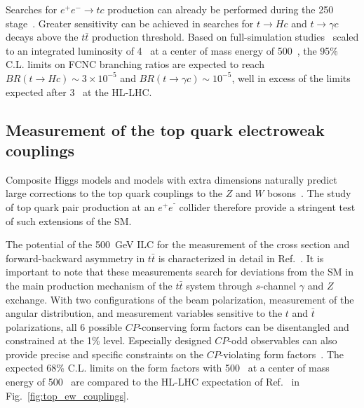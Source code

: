 Searches for $e^+e^- \rightarrow t c$ production can
already be performed during the 250~\GeV{} stage~\cite{Hesari:2014eua}. Greater
sensitivity can be achieved in searches for $t \rightarrow Hc$ and 
$t\rightarrow \gamma c$ decays above the $t\bar{t}$ production threshold.
Based on full-simulation studies~\cite{Zarnecki:2018wsw, Abramowicz:2018rjq} 
scaled to an integrated luminosity of 4~\iab{} 
at a center of mass energy of 500~\GeV{}{}, the 95\% C.L. limits on FCNC branching
ratios are expected to reach $BR(t \rightarrow Hc) \sim 3 \times 10^{-5}$ and 
$BR(t \rightarrow \gamma c) \sim 10^{-5}$, well in excess of the 
limits expected after 3~\iab{} at the HL-LHC. 


\subsection{Measurement of the top quark electroweak couplings}
\label{subsec:top:topelectroweak}

Composite Higgs models and models with extra dimensions naturally
predict  large corrections to the top quark couplings to the $Z$ and
$W$ bosons~\cite{Richard:2014upa,Barducci:2015aoa,Durieux:2018ekg}.
The study of top quark pair production at an $e^+e^⁻$ collider therefore provide
a stringent test of such extensions of the SM.

The potential of the 500~GeV ILC for the measurement of the cross section and forward-backward asymmetry in
$t\bar{t}$ is characterized in detail in Ref.~\cite{Amjad:2015mma}. It
is important to note that these measurements search for deviations
from the SM in the main production mechanism of the $t\bar t$ system
through $s$-channel $\gamma$ and $Z$ exchange.   With two
configurations of the beam polarization, measurement of the angular
distribution, and measurement variables sensitive to the $t$ and $\bar
t$ polarizations, all 6 possible $CP$-conserving form factors can be
disentangled and constrained at the 1\% level. 
Especially designed $CP$-odd observables can also provide precise and
specific constraints on the $CP$-violating form factors~\cite{Bernreuther:2017cyi}. 
The expected 68\% C.L. limits on the form factors with 500~\ifb{} at
a center of mass energy of 500~\GeV{} are compared to the HL-LHC
expectation of Ref.~\cite{Baur:2004uw,Baur:2005wi} in Fig.~\ref{fig:top_ew_couplings}.

